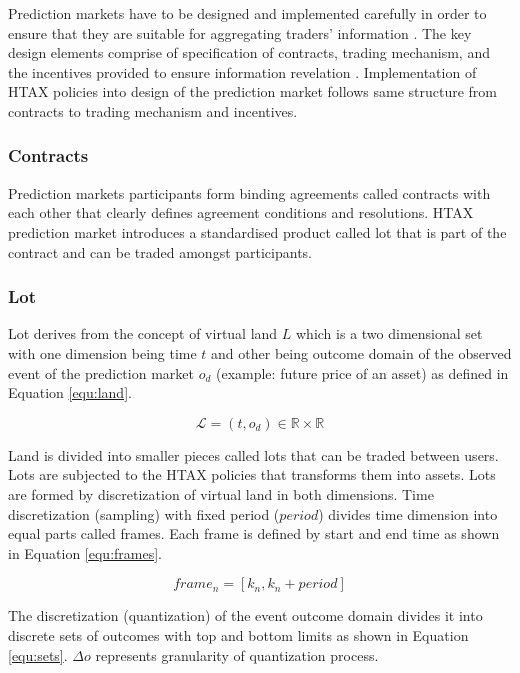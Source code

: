\documentclass{article}
\begin{document}
	Prediction markets have to be designed and implemented carefully in order to ensure that they are suitable for aggregating traders’ information \cite{Weinhardt}. The key design elements comprise of specification of contracts, trading mechanism, and the incentives provided to ensure information revelation \cite{Spann}. Implementation of HTAX policies into design of the prediction market follows same structure from contracts to trading mechanism and incentives. 
	
	\subsubsection{Contracts}
	
	Prediction markets participants form binding agreements called contracts with each other that clearly defines agreement conditions and resolutions. HTAX prediction market introduces a standardised product called lot that is part of the contract and can be traded amongst participants. 
	
	\subsubsection*{Lot} \label{sec:lot}
	
	Lot derives from the concept of virtual land $L$ which is a two dimensional set with one dimension being time $t$ and other being outcome domain of the observed event of the prediction market $o_d$ (example: future price of an asset) as defined in Equation \ref{equ:land}.
	
	\begin{equation}
		\mathcal{L}={(t,o_d)\in \mathbb{R} \times \mathbb{R}}
		\label{equ:land}
	\end{equation}
	
	Land is divided into smaller pieces called lots that can be traded between users. Lots are subjected to the HTAX policies that transforms them into assets. Lots are formed by discretization of virtual land in both dimensions. Time discretization (sampling) with fixed period ($period$) divides time dimension into equal parts called frames. Each frame is defined by start and end time as shown in Equation \ref{equ:frames}.
	
	\begin{equation}
		frame_n=[k_{n},k_{n}+period]
		\label{equ:frames}
	\end{equation}
	
	The discretization (quantization) of the event outcome domain divides it into discrete sets of outcomes with top and bottom limits as shown in Equation \ref{equ:sets}. $\Delta o$ represents granularity of quantization process. 
	
\end{document}
